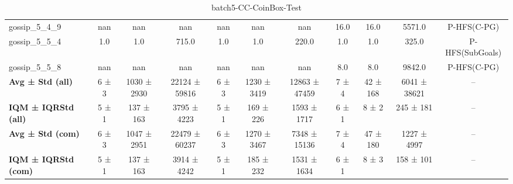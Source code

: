 \begin{table}[!ht]
\begin{tabular}{l|ccc|ccc|cccc}
gossip\_5\_4\_9 & nan & nan & nan & nan & nan & nan & 16.0 & 16.0 & 5571.0 & P-HFS(C-PG) \\
gossip\_5\_5\_4 & 1.0 & 1.0 & 715.0 & 1.0 & 1.0 & 220.0 & 1.0 & 1.0 & 325.0 & P-HFS(SubGoals) \\
gossip\_5\_5\_8 & nan & nan & nan & nan & nan & nan & 8.0 & 8.0 & 9842.0 & P-HFS(C-PG) \\
\hline
\textbf{Avg ± Std (all)} & 6 ± 3 & 1030 ± 2930 & 22124 ± 59816 & 6 ± 3 & 1230 ± 3419 & 12863 ± 47459 & 7 ± 4 & 42 ± 168 & 6041 ± 38621 & -- \\
\textbf{IQM ± IQRStd (all)} & 5 ± 1 & 137 ± 163 & 3795 ± 4223 & 5 ± 1 & 169 ± 226 & 1593 ± 1717 & 6 ± 1 & 8 ± 2 & 245 ± 181 & -- \\
\textbf{Avg ± Std (com)} & 6 ± 3 & 1047 ± 2951 & 22479 ± 60237 & 6 ± 3 & 1270 ± 3467 & 7348 ± 15136 & 7 ± 4 & 47 ± 180 & 1227 ± 4997 & -- \\
\textbf{IQM ± IQRStd (com)} & 5 ± 1 & 137 ± 163 & 3914 ± 4242 & 5 ± 1 & 185 ± 232 & 1531 ± 1634 & 6 ± 1 & 8 ± 3 & 158 ± 101 & -- \\
\end{tabular}
\caption{batch5-CC-CoinBox-Test}
\label{tab:batch5_CC-CoinBox_comparison_test}
\end{table}
